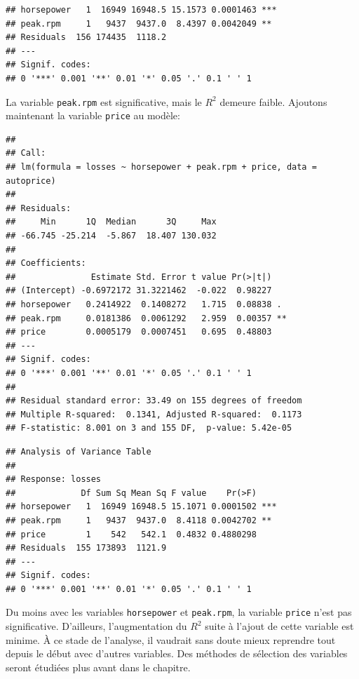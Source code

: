 \begin{solution}{3.9}
\begin{knitrout}
\begin{kframe}
\begin{verbatim}
## horsepower   1  16949 16948.5 15.1573 0.0001463 ***
## peak.rpm     1   9437  9437.0  8.4397 0.0042049 **
## Residuals  156 174435  1118.2
## ---
## Signif. codes:
## 0 '***' 0.001 '**' 0.01 '*' 0.05 '.' 0.1 ' ' 1
\end{verbatim}
\end{kframe}
\end{knitrout}
    La variable \texttt{peak.rpm} est significative, mais le $R^2$
    demeure faible. Ajoutons maintenant la variable \texttt{price} au modèle:
\begin{knitrout}
\color{fgcolor}\begin{kframe}
\begin{alltt}
 \hlkwb{<-}  \hlopt{~}  \hlopt{+}  \hlopt{+}   
\end{alltt}
\begin{verbatim}
##
## Call:
## lm(formula = losses ~ horsepower + peak.rpm + price, data = autoprice)
##
## Residuals:
##     Min      1Q  Median      3Q     Max
## -66.745 -25.214  -5.867  18.407 130.032
##
## Coefficients:
##               Estimate Std. Error t value Pr(>|t|)
## (Intercept) -0.6972172 31.3221462  -0.022  0.98227
## horsepower   0.2414922  0.1408272   1.715  0.08838 .
## peak.rpm     0.0181386  0.0061292   2.959  0.00357 **
## price        0.0005179  0.0007451   0.695  0.48803
## ---
## Signif. codes:
## 0 '***' 0.001 '**' 0.01 '*' 0.05 '.' 0.1 ' ' 1
##
## Residual standard error: 33.49 on 155 degrees of freedom
## Multiple R-squared:  0.1341,	Adjusted R-squared:  0.1173
## F-statistic: 8.001 on 3 and 155 DF,  p-value: 5.42e-05
\end{verbatim}
\begin{alltt}
\end{alltt}
\begin{verbatim}
## Analysis of Variance Table
##
## Response: losses
##             Df Sum Sq Mean Sq F value    Pr(>F)
## horsepower   1  16949 16948.5 15.1071 0.0001502 ***
## peak.rpm     1   9437  9437.0  8.4118 0.0042702 **
## price        1    542   542.1  0.4832 0.4880298
## Residuals  155 173893  1121.9
## ---
## Signif. codes:
## 0 '***' 0.001 '**' 0.01 '*' 0.05 '.' 0.1 ' ' 1
\end{verbatim}
\end{kframe}
\end{knitrout}
    Du moins avec les variables \texttt{horsepower} et
    \texttt{peak.rpm}, la variable \texttt{price} n'est pas
    significative. D'ailleurs, l'augmentation du $R^2$ suite à l'ajout
    de cette variable est minime. À ce stade de l'analyse, il vaudrait
    sans doute mieux reprendre tout depuis le début avec d'autres
    variables. Des méthodes de sélection des variables seront étudiées
    plus avant dans le chapitre.
  
\end{solution}
